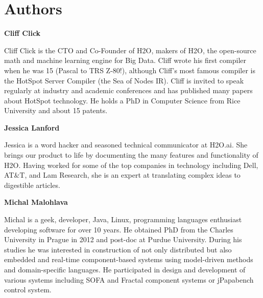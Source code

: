 






\newpage

\section{Authors}

\textbf{Cliff Click}

Cliff Click is the CTO and Co-Founder of H2O, makers of H2O, the open-source math and machine learning engine for Big Data. Cliff wrote his first compiler when he was 15 (Pascal to TRS Z-80!), although Cliff’s most famous compiler is the HotSpot Server Compiler (the Sea of Nodes IR). Cliff is invited to speak regularly at industry and academic conferences and has published many papers about HotSpot technology. He holds a PhD in Computer Science from Rice University and about 15 patents.

\textbf{Jessica Lanford}

Jessica is a word hacker and seasoned technical communicator at H2O.ai. She brings our product to life by documenting the many features and functionality of H2O. Having worked for some of the top companies in technology including Dell, AT$\&$T, and Lam Research, she is an expert at translating complex ideas to digestible articles.

\textbf{Michal Malohlava}

Michal is a geek, developer, Java, Linux, programming languages enthusiast developing software for over 10 years. He obtained PhD from the Charles University in Prague in 2012 and post-doc at Purdue University. During his studies he was interested in construction of not only distributed but also embedded and real-time component-based systems using model-driven methods and domain-specific languages. He participated in design and development of various systems including SOFA and Fractal component systems or jPapabench control system.

